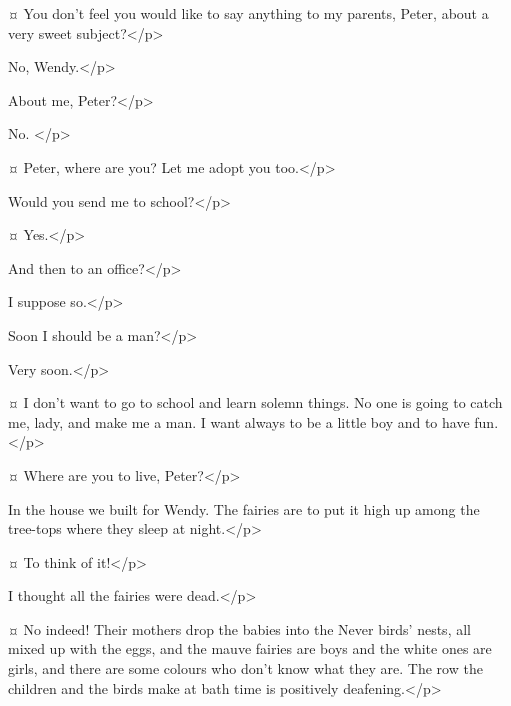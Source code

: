 \begin{drama}

\wendyspeaks {}¤
You don't feel you would like to say anything to my parents, Peter, about a very sweet subject?</p>

\peterspeaks
No, Wendy.</p>

\wendyspeaks
About me, Peter?</p>

\peterspeaks
No.
</p>

\mrsdarlingspeaks {}¤
Peter, where are you?
Let me adopt you too.</p>


\peterspeaks
Would you send me to school?</p>

\mrsdarlingspeaks {}¤
Yes.</p>

\peterspeaks
And then to an office?</p>

\mrsdarlingspeaks
I suppose so.</p>

\peterspeaks
Soon I should be a man?</p>

\mrsdarlingspeaks
Very soon.</p>

\peterspeaks {}¤
I don't want to go to school and learn solemn things.
No one is going to catch me, lady, and make me a man.
I want always to be a little boy and to have fun.</p>


\mrsdarlingspeaks {}¤
Where are you to live, Peter?</p>

\peterspeaks
In the house we built for Wendy.
The fairies are to put it high up among the tree-tops where they sleep at night.</p>

\wendyspeaks {}¤
To think of it!</p>

\mrsdarlingspeaks
I thought all the fairies were dead.</p>

\wendyspeaks {}¤
No indeed!
Their mothers drop the babies into the Never birds' nests, all mixed up with the eggs,
and the mauve fairies are boys and the white ones are girls,
and there are some colours who don't know what they are.
The row the children and the birds make at bath time is positively deafening.</p>


\end{drama}
